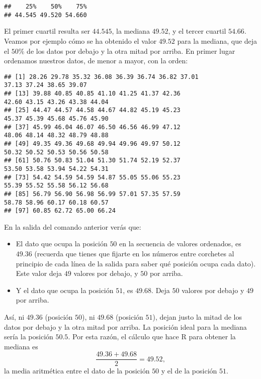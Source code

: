 \documentclass[
  degree=mecinf,
  title=normal,
  toc=normal,
  bib=normal]{mnye}
\newenvironment{Shaded}{\begin{snugshade}}{\end{snugshade}}
\newcommand{\FunctionTok}[1]{\textcolor[rgb]{0.00,0.00,0.00}{#1}}
\newcommand{\NormalTok}[1]{#1}
\newcommand{\SpecialCharTok}[1]{\textcolor[rgb]{0.00,0.00,0.00}{#1}}
\begin{document}
\begin{verbatim}
##    25%    50%    75% 
## 44.545 49.520 54.660
\end{verbatim}

El primer cuartil resulta ser \(44.545\), la mediana \(49.52\), y el tercer cuartil \(54.66\). Veamos por ejemplo cómo se ha obtenido el valor \(49.52\) para la mediana, que deja el \(50\%\) de los datos por debajo y la otra mitad por arriba. En primer lugar ordenamos nuestros datos, de menor a mayor, con la orden:

\begin{Shaded}
\end{Shaded}

\begin{verbatim}
## [1] 28.26 29.78 35.32 36.08 36.39 36.74 36.82 37.01
37.13 37.24 38.65 39.07
## [13] 39.88 40.85 40.85 41.10 41.25 41.37 42.36
42.60 43.15 43.26 43.38 44.04
## [25] 44.47 44.57 44.58 44.67 44.82 45.19 45.23
45.37 45.39 45.68 45.76 45.90
## [37] 45.99 46.04 46.07 46.50 46.56 46.99 47.12
48.06 48.14 48.32 48.79 48.88
## [49] 49.35 49.36 49.68 49.94 49.96 49.97 50.12
50.32 50.52 50.53 50.56 50.58
## [61] 50.76 50.83 51.04 51.30 51.74 52.19 52.37
53.50 53.58 53.94 54.22 54.31
## [73] 54.42 54.59 54.59 54.87 55.05 55.06 55.23
55.39 55.52 55.58 56.12 56.68
## [85] 56.79 56.90 56.98 56.99 57.01 57.35 57.59
58.78 58.96 60.17 60.18 60.57
## [97] 60.85 62.72 65.00 66.24
\end{verbatim}

En la salida del comando anterior verás que:

\begin{itemize}
\item
  El dato que ocupa la posición \(50\) en la secuencia de valores ordenados, es \(49.36\) (recuerda que tienes que fijarte en los números entre corchetes al principio de cada línea de la salida para saber qué posición ocupa cada dato). Este valor deja \(49\) valores por debajo, y \(50\) por arriba.
\item
  Y el dato que ocupa la posición \(51\), es \(49.68\). Deja \(50\) valores por debajo y \(49\) por arriba.
\end{itemize}

Así, ni \(49.36\) (posición \(50\)), ni \(49.68\) (posición \(51\)), dejan justo la mitad de los datos por debajo y la otra mitad por arriba.
La posición ideal para la mediana sería la posición \(50.5\). Por esta razón, el cálculo que hace \textsf{R} para obtener la mediana es
\[
\frac{49.36+49.68}{2}=49.52,
\]
la media aritmética entre el dato de la posición \(50\) y el de la posición \(51\).
\end{document}

